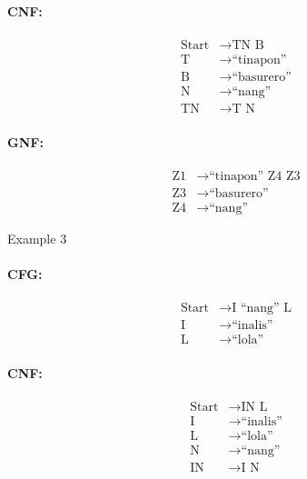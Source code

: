 \paragraph{CNF:}
\begin{equation*}
    \begin{aligned}
        \text{Start}   & \rightarrow \text{TN B}   \\
        \text{T} & \rightarrow \text{“tinapon”} \\
        \text{B} & \rightarrow \text{“basurero”} \\
        \text{N} & \rightarrow \text{“nang”} \\
        \text{TN} & \rightarrow \text{T N}
    \end{aligned}
\end{equation*}

\paragraph{GNF:}
\begin{equation*}
    \begin{aligned}
        \text{Z1}   & \rightarrow \text{“tinapon” Z4 Z3}   \\
        \text{Z3} & \rightarrow \text{“basurero”} \\
        \text{Z4} & \rightarrow \text{“nang”}
    \end{aligned}
\end{equation*}

Example 3
\paragraph{CFG:}
\begin{equation*}
    \begin{aligned}
        \text{Start}   & \rightarrow \text{I “nang” L}   \\
        \text{I} & \rightarrow \text{“inalis”} \\
        \text{L} & \rightarrow \text{“lola”}
    \end{aligned}
\end{equation*}

\paragraph{CNF:}
\begin{equation*}
    \begin{aligned}
        \text{Start}   & \rightarrow \text{IN L}   \\
        \text{I} & \rightarrow \text{“inalis”} \\
        \text{L} & \rightarrow \text{“lola”} \\
        \text{N} & \rightarrow \text{“nang”} \\
        \text{IN} & \rightarrow \text{I N}
    \end{aligned}
\end{equation*}


